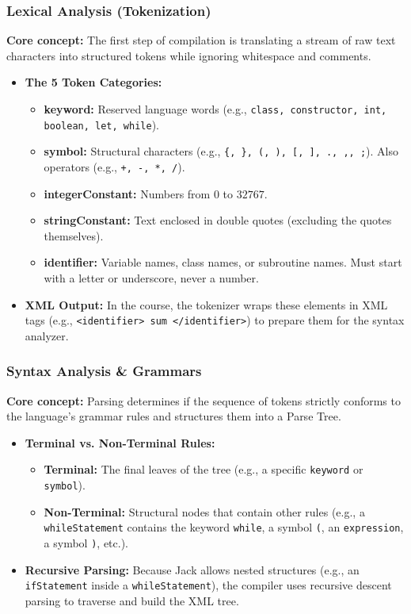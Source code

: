 \documentclass[12pt,a4paper]{article}
\begin{document}
\subsubsection*{Lexical Analysis (Tokenization)}
\textbf{Core concept:} The first step of compilation is translating a stream of raw text characters into structured tokens while ignoring whitespace and comments.
\begin{itemize}
    \item \textbf{The 5 Token Categories:} 
    \begin{itemize}
        \item \textbf{keyword:} Reserved language words (e.g., \texttt{class, constructor, int, boolean, let, while}).
        \item \textbf{symbol:} Structural characters (e.g., \texttt{\{, \}, (, ), [, ], ., ,, ;}). Also operators (e.g., \texttt{+, -, *, /}).
        \item \textbf{integerConstant:} Numbers from $0$ to $32767$.
        \item \textbf{stringConstant:} Text enclosed in double quotes (excluding the quotes themselves).
        \item \textbf{identifier:} Variable names, class names, or subroutine names. Must start with a letter or underscore, never a number.
    \end{itemize}
    \item \textbf{XML Output:} In the course, the tokenizer wraps these elements in XML tags (e.g., \texttt{<identifier> sum </identifier>}) to prepare them for the syntax analyzer.
\end{itemize}

\subsubsection*{Syntax Analysis \& Grammars}
\textbf{Core concept:} Parsing determines if the sequence of tokens strictly conforms to the language's grammar rules and structures them into a Parse Tree.
\begin{itemize}
    \item \textbf{Terminal vs. Non-Terminal Rules:}
    \begin{itemize}
        \item \textbf{Terminal:} The final leaves of the tree (e.g., a specific \texttt{keyword} or \texttt{symbol}).
        \item \textbf{Non-Terminal:} Structural nodes that contain other rules (e.g., a \texttt{whileStatement} contains the keyword \texttt{while}, a symbol \texttt{(}, an \texttt{expression}, a symbol \texttt{)}, etc.).
    \end{itemize}
    \item \textbf{Recursive Parsing:} Because Jack allows nested structures (e.g., an \texttt{ifStatement} inside a \texttt{whileStatement}), the compiler uses recursive descent parsing to traverse and build the XML tree.
\end{itemize}
\end{document}
